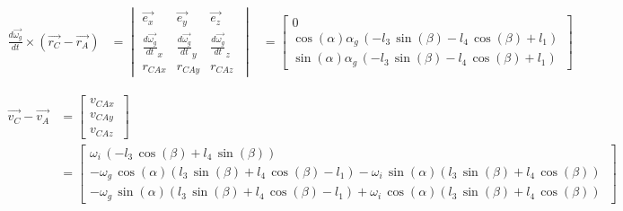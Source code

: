 \begin{equation*}
\begin{split}
\frac{d\overrightarrow{\omega_{g}}}{dt}\times(\overrightarrow{r_{C}}-\overrightarrow{r_{A}})
&=	\begin{vmatrix}
	\overrightarrow{e_{x}} & \overrightarrow{e_{y}} & \overrightarrow{e_{z}}\\
	\frac{d\overrightarrow{\omega_g}}{dt}_{x} & \frac{d\overrightarrow{\omega_g}}{dt}_{y} & \frac{d\overrightarrow{\omega_g}}{dt}_{z}\\
	r_{CAx} & r_{CAy} & r_{CAz}\
	\end{vmatrix}
&=	\begin{bmatrix}
	0\\
	\cos \left( \alpha\right) \alpha_{g}\, \left( -l_{3}\,\sin \left( \beta \right) -l_{4}\,\cos \left( \beta \right) +l_{1} \right) \\
	\sin\left( \alpha \right) \alpha_{g}\, \left( -l_{3}\,\sin \left( \beta\right) -l_{4}\,\cos \left( \beta \right) +l_{1} \right)\
	\end{bmatrix}
\end{split}
\end{equation*}

\begin{equation*}
\begin{split}
\overrightarrow{v_{C}}-\overrightarrow{v_{A}}
&=	\begin{bmatrix}
	v_{CAx}\\
	v_{CAy}\\
	v_{CAz}\
	\end{bmatrix}\\
&=	\begin{bmatrix}
	\omega_{i}\, \left( -l_{3}\,\cos \left( \beta \right) +l_{4}\,\sin \left( \beta \right)  \right) \\
	-\omega_{g}\,\cos \left( \alpha \right)  \left( l_{3}\,\sin \left( \beta \right) +l_{4}\,\cos \left( \beta \right) -l_{1} \right) -\omega_{i}\,\sin \left( \alpha \right)  \left( l_{3}\,\sin\left( \beta \right) +l_{4}\,\cos \left( \beta \right)  \right) \\
	-\omega_{g}\,\sin \left( \alpha \right)  \left( l_{3}\,\sin \left( \beta \right) +l_{4}\,\cos \left( \beta \right) -l_{1} \right) +\omega_{i}\,\cos \left( \alpha \right)  \left( l_{3}\,\sin\left( \beta \right) +l_{4}\,\cos \left( \beta \right)  \right)\
	\end{bmatrix}
\end{split}
\end{equation*}

